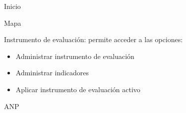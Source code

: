     \begin{Citemize}
      \item Inicio
      \item Mapa
      \item Instrumento de evaluación: permite acceder a las opciones:
	\begin{itemize}
	  \item Administrar instrumento de evaluación
	  \item Administrar indicadores
	  \item Aplicar instrumento de evaluación activo
	\end{itemize}
      \item ANP\\\\\\
    \end{Citemize}


